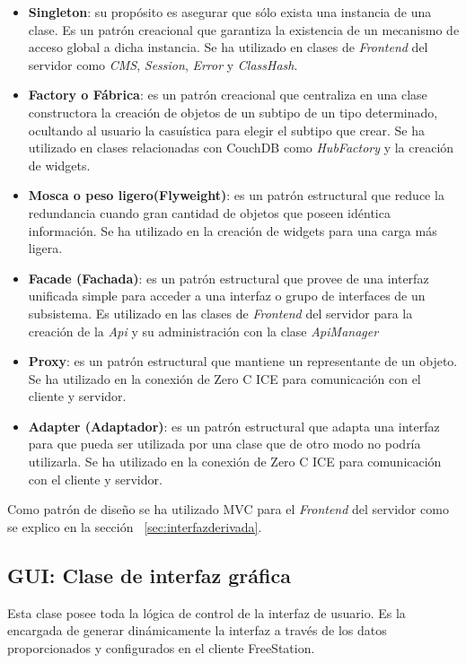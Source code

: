 \begin{itemize}
  \item \textbf{Singleton}: su propósito es asegurar que sólo exista una
  instancia de una clase. Es un patrón creacional que garantiza la existencia de un mecanismo de
  acceso global a dicha instancia. Se ha utilizado en clases de \emph{Frontend}
  del servidor como \emph{CMS}, \emph{Session}, \emph{Error} y
  \emph{ClassHash}.
  \item \textbf{Factory o Fábrica}: es un patrón creacional que centraliza en
  una clase constructora la creación de objetos de un subtipo de un tipo determinado, 
  ocultando al usuario la casuística para elegir el subtipo que crear. Se ha
  utilizado en clases relacionadas con CouchDB como \emph{HubFactory} y la
  creación de widgets.
  \item \textbf{Mosca o peso ligero(Flyweight)}: es un patrón estructural que
  reduce la redundancia cuando gran cantidad de objetos que poseen idéntica información.
  Se ha utilizado en la creación de widgets para una carga más ligera.
  \item \textbf{Facade (Fachada)}: es un patrón estructural que provee de una
  interfaz unificada simple para acceder a una interfaz o grupo de interfaces de un 
  subsistema. Es utilizado en las clases de \emph{Frontend} del servidor para
  la creación de la \emph{Api} y su administración con la clase
  \emph{ApiManager}
  \item \textbf{Proxy}: es un patrón estructural que mantiene un representante
  de un objeto.
  Se ha utilizado en la conexión de Zero C ICE para comunicación con el cliente
  y servidor.
  \item \textbf{Adapter (Adaptador)}: es un patrón estructural que adapta una
  interfaz para que pueda ser utilizada por una clase que de otro modo no podría utilizarla.
  Se ha utilizado en la conexión de Zero C ICE para comunicación con el cliente
  y servidor.
\end{itemize}

Como patrón de diseño se ha utilizado \acs{MVC}\label{acro:MVC} para el
\emph{Frontend} del servidor como se explico en la sección
~\ref{sec:interfazderivada}.

\newpage

\subsection{GUI: Clase de interfaz gráfica}
\label{sec:widgetloader}
Esta clase posee toda la lógica de control de la interfaz de usuario. Es la
encargada de generar dinámicamente la interfaz a través de los datos
proporcionados y configurados en el cliente FreeStation.

